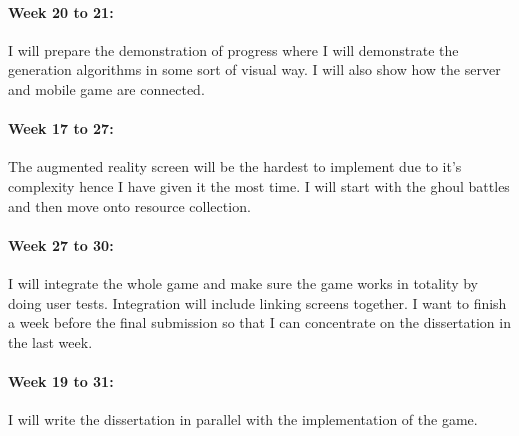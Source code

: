 \documentclass[11pt,openright,a4paper]{report}
\begin{document}
		\paragraph{Week 20 to 21:} I will prepare the demonstration of progress where I will demonstrate the generation algorithms in some sort of visual way. I will also show how the server and mobile game are connected. 
		\newline
		\paragraph{Week 17 to 27:} The augmented reality screen will be the hardest to implement due to it's complexity hence I have given it the most time. I will start with the ghoul battles and then move onto resource collection. 
		\newline
		\paragraph{Week 27 to  30:} I will integrate the whole game and make sure the game works in totality by doing user tests. Integration will include linking screens together. I want to finish a week before the final submission so that I can concentrate on the dissertation in the last week. 
		\paragraph{Week 19 to 31:}
		I will write the dissertation in parallel with the implementation of the game.
		
\end{document}
